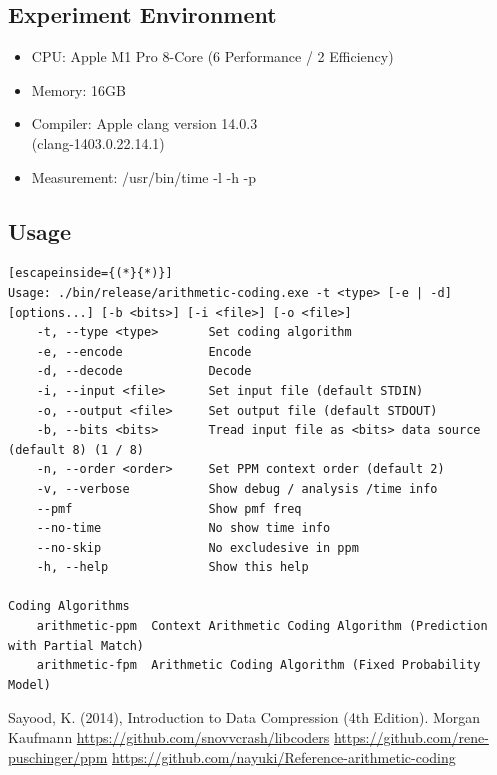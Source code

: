 \documentclass[a4paper,conference]{IEEEtran}
\begin{document}
\subsection{Experiment Environment}

\begin{itemize}
\item CPU: Apple M1 Pro 8-Core (6 Performance / 2 Efficiency)
\item Memory: 16GB
\item Compiler: Apple clang version 14.0.3 \\ (clang-1403.0.22.14.1)
\item Measurement: /usr/bin/time -l -h -p
\end{itemize}

\subsection{Usage}

\begin{lstlisting}[escapeinside={(*}{*)}]
Usage: ./bin/release/arithmetic-coding.exe -t <type> [-e | -d] [options...] [-b <bits>] [-i <file>] [-o <file>]
    -t, --type <type>       Set coding algorithm
    -e, --encode            Encode
    -d, --decode            Decode
    -i, --input <file>      Set input file (default STDIN)
    -o, --output <file>     Set output file (default STDOUT)
    -b, --bits <bits>       Tread input file as <bits> data source (default 8) (1 / 8)
    -n, --order <order>     Set PPM context order (default 2)
    -v, --verbose           Show debug / analysis /time info
    --pmf                   Show pmf freq
    --no-time               No show time info
    --no-skip               No excludesive in ppm
    -h, --help              Show this help

Coding Algorithms
    arithmetic-ppm  Context Arithmetic Coding Algorithm (Prediction with Partial Match)
    arithmetic-fpm  Arithmetic Coding Algorithm (Fixed Probability Model)
\end{lstlisting}

\begin{thebibliography}{00}
 Sayood, K. (2014), Introduction to Data Compression (4th Edition). Morgan Kaufmann
 \url{https://github.com/snovvcrash/libcoders}
 \url{https://github.com/rene-puschinger/ppm}
 \url{https://github.com/nayuki/Reference-arithmetic-coding}
\end{thebibliography}
\end{document}
